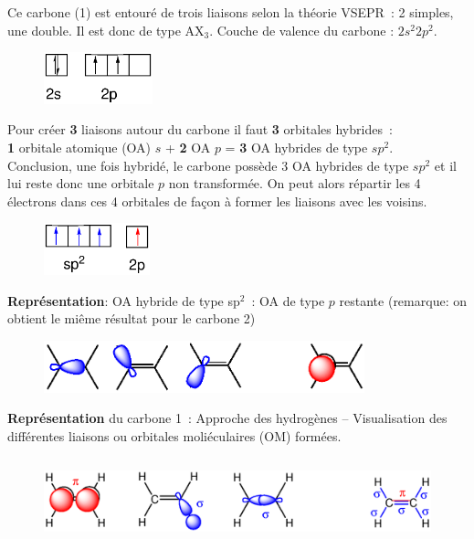 Ce carbone (1) est entour\'e de trois liaisons selon la th\'eorie VSEPR~: 2 simples, une double. Il est donc de type AX$_3$. 
Couche de valence du carbone : $2s^2 2p^2$.
%
\begin{figure}[!h]
\begin{center}
\includegraphics[height=1.5cm]{figure/vsepr4.eps}
\end{center}
\end{figure}
%

Pour cr\'eer \textbf{3} liaisons autour du carbone il faut \textbf{3} orbitales hybrides~:\\
\textbf{1} orbitale atomique (OA) $s$ + \textbf{2} OA $p$ = \textbf{3} OA hybrides de type $sp^2$.\\
Conclusion, une fois hybrid\'e, le carbone poss\`ede 3 OA hybrides de type $sp^2$ et il lui reste donc une orbitale $p$
non transform\'ee. On peut alors r\'epartir les 4 \'electrons dans ces 4 orbitales de fa\c{c}on \`a former 
les liaisons avec les voisins.
\begin{figure}[!h]
\begin{center}
\includegraphics[height=1.5cm]{figure/vsepr5.eps}
\end{center}
\end{figure}

\clearpage

\textbf{Repr\'esentation}:
OA hybride de type sp$^2$~:     OA de type $p$ restante (remarque: on obtient le mi\^eme r\'esultat pour le carbone 2)
\begin{figure}[!h]
\begin{center}
\includegraphics[height=1.5cm]{figure/vsepr6.eps}
\end{center}
\end{figure}

\textbf{Repr\'esentation} du carbone 1~: 
Approche des hydrog\`enes -- Visualisation des diff\'erentes 
liaisons ou orbitales moli\'eculaires (OM) form\'ees.
\begin{figure}[!h]
\begin{center}
\includegraphics[height=2.5cm]{figure/vsepr7.eps}
\end{center}
\end{figure}


